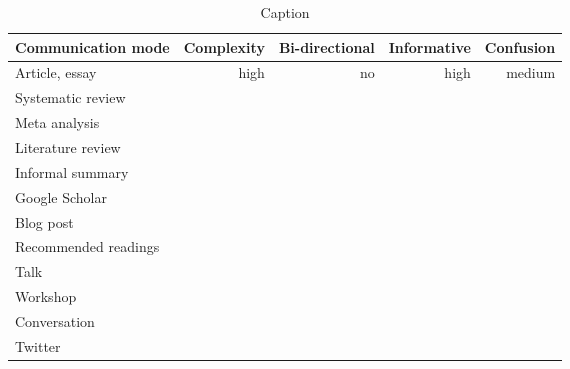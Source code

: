 \begin{table*}\centering
{}
\begin{tabular}{@{}lrrrr@{}}\toprule
Communication mode & Complexity & Bi-directional & Informative  & Confusion
\\\midrule
Article, essay & high & no & high & medium  \\
Systematic review \\
Meta analysis \\
Literature review \\
Informal summary \\
Google Scholar \\
Blog post \\
Recommended readings \\
Talk \\
Workshop \\
Conversation \\
Twitter \\


\bottomrule
\end{tabular}
\caption{Caption}
\end{table*}